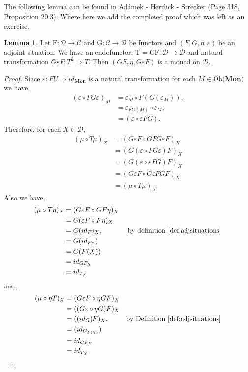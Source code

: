 \documentclass[11pt,a4paper]{article}
\theoremstyle{definition}
\newtheorem{lemma}[thm]{Lemma}
\newcommand\ob[1]{\mathrm{Ob(}#1\mathrm{)}}
\newcommand\cat[1]{\mathscr{#1}}
\newcommand\func[3]{\mathrm{#1}\colon#2\rightarrow#3}
\newcommand\nattran[3]{#1\colon#2\Rightarrow#3}
\numberwithin{equation}{section}
\begin{document}
The following lemma can be found in Adámek - Herrlick - Strecker \cite{ACC} (Page 318, Proposition 20.3). Where here we add the completed proof which was left as an exercise.
\begin{lemma}
    \label{lem:adjsitumonad}
    Let $\func{F}{\cat{D}}{\cat{C}}$ and $\func{G}{\cat{C}}{\cat{D}} $ be functors and $(F,G,\eta,\varepsilon)$ be an adjoint situation. We have an endofunctor, $\func{T =GF}{\cat{D}}{\cat{D}}$ and natural transformation $\nattran{G\varepsilon F}{T^{2}}{T}$. Then $(GF, \eta, G\varepsilon F)$ is a monad on $\cat{D}$.
\end{lemma}
\begin{proof}
Since $\nattran{\varepsilon}{FU}{id_{\mathbf{Mon}}}$ is a natural transformation for each $M\in\ob{\mathbf{Mon}}$ we have,
\begin{align*}
(\varepsilon \circ FG\varepsilon)_M&= \varepsilon_M \circ F(G(\varepsilon_M)), \\
&= \varepsilon_{FG(M)} \circ \varepsilon_M,\\
&= (\varepsilon \circ \varepsilon FG).
\end{align*}
Therefore, for each $X\in\cat{D}$,
\begin{align*}
    (\mu \circ T\mu)_X &= (G\varepsilon F \circ GF G\varepsilon F)_X\\
    &= (G(\varepsilon \circ FG\varepsilon) F)_X \\
    &= (G(\varepsilon \circ \varepsilon FG)F)_X \\
    &= (G\varepsilon F\circ G\varepsilon FGF)_X \\
    &= (\mu \circ T\mu)_X.
\end{align*}
Also we have,
    \begin{align*} 
        (\mu \circ T\eta)_X &= (G\varepsilon F \circ GF\eta)_X\\
        &= G(\varepsilon F \circ F\eta)_X \\
        &= G(id_{F})_X, & \text{ by definition \ref{def:adjsituations}}\\
        &= G(id_{F_{X}})\\
        &= G(F(X))\\
        &= id_{GF_{X}} \\
        &= id_{T_{X}}
    \end{align*}
and,
\begin{align*}
    (\mu \circ \eta T)_X &= (G\varepsilon F \circ \eta GF)_X \\
    &= ((G\varepsilon\circ \eta G)F)_X \\
    &= ((id_{G})F)_X, &\text{by Definition \ref{def:adjsituations}} \\
    &= (id_{G_{F(X)}}) \\
    &= id_{GF_{X}} \\
    &= id_{T_{X}}.
\end{align*}
\end{proof}
\end{document}
